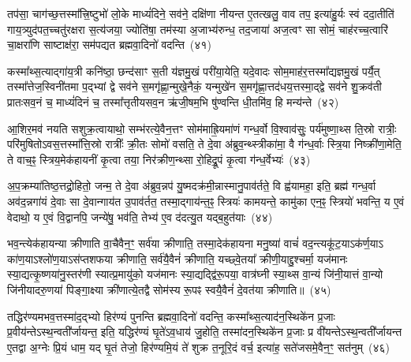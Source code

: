 तप॑सा॒ चाग॑च्छ॒त्तस्मा᳚त्त्रि॒ष्टुभो॑ लो॒के माध्यं॑दिने॒ सव॑ने॒ दक्षि॑णा नीयन्त ए॒तत्खलु॒ वाव तप॒ इत्या॑हु॒र्यः स्वं ददा॒तीति॑ गाय॒त्र्युद॑पत॒च्चतु॑रक्षरा स॒त्य॑जया॒ ज्योति॑षा॒ तम॑स्या अ॒जाभ्य॑रुन्ध॒ तद॒जाया॑ अज॒त्वꣳ सा सोमं॒ चाह॑रच्च॒त्वारि॑ चा॒क्षरा॑णि साष्टाक्ष॑रा॒ सम॑पद्यत ब्रह्मवा॒दिनो॑ वदन्ति~(४१)

कस्मा᳚थ्स॒त्याद्गा॑य॒त्री कनि॑ष्ठा॒ छन्द॑साꣳ स॒ती य॑ज्ञमु॒खं परी॑या॒येति॒ यदे॒वादः सोम॒माह॑र॒त्तस्मा᳚द्यज्ञमु॒खं पर्यै॒त् तस्मा᳚त्तेज॒स्विनी॑तमा प॒द्भ्यां द्वे सव॑ने स॒मगृ॑ह्णा॒न्मुखे॒नैकं॒ यन्मुखे॑न स॒मगृ॑ह्णा॒त्तद॑धय॒त्तस्मा॒द्द्वे सव॑ने शु॒क्रव॑ती प्रातःसव॒नं च॒ माध्यं॑दिनं च॒ तस्मा᳚त्तृतीयसव॒न ऋ॑जी॒षम॒भि षु॑ण्वन्ति धी॒तमि॑व॒ हि मन्य॑न्ते~(४२)

आ॒शिर॒मव॑ नयति सशुक्र॒त्वायाथो॒ सम्भ॑रत्ये॒वैन॒त्तꣳ सोम॑माह्रि॒यमा॑णं गन्ध॒र्वो वि॒श्वाव॑सुः॒ पर्य॑मुष्णा॒थ्स ति॒स्रो रात्रीः॒ परि॑मुषितो\-ऽवस॒त्तस्मा᳚त्ति॒स्रो रात्रीः᳚ क्री॒तः सोमो॑ वसति॒ ते दे॒वा अ॑ब्रुव॒न्थ्स्त्रीका॑मा॒ वै ग॑न्ध॒र्वाः स्त्रि॒या निष्क्री॑णा॒मेति॒ ते वाच॒ꣴ॒ स्त्रिय॒मेक॑हायनीं कृ॒त्वा तया॒ निर॑क्रीण॒न्थ्सा रो॒हिद्रू॒पं कृ॒त्वा ग॑न्ध॒र्वेभ्यः॑~(४३)

अ॒प॒क्रम्या॑तिष्ठ॒त्तद्रो॒हितो॒ जन्म॒ ते दे॒वा अ॑ब्रुव॒न्नप॑ यु॒ष्मदक्र॑मी॒न्नास्मानु॒पाव॑र्तते॒ वि ह्व॑यामहा॒ इति॒ ब्रह्म॑ गन्ध॒र्वा अव॑द॒न्नगा॑यं दे॒वाः सा दे॒वान्गाय॑त उ॒पाव॑र्तत॒ तस्मा॒द्गाय॑न्त॒ꣴ॒ स्त्रियः॑ कामयन्ते॒ कामु॑का एन॒ꣴ॒ स्त्रियो॑ भवन्ति॒ य ए॒वं वेदाथो॒ य ए॒वं वि॒द्वानपि॒ जन्ये॑षु॒ भव॑ति॒ तेभ्य॑ ए॒व द॑दत्यु॒त यद्ब॒हुत॑याः~(४४)

भव॒न्त्येक॑हायन्या क्रीणाति वा॒चैवैन॒ꣳ॒ सर्व॑या क्रीणाति॒ तस्मा॒देक॑हायना मनु॒ष्या॑ वाचं॑ वद॒न्त्यकू॑ट॒या\-ऽक॑र्ण॒या\-ऽ का॑ण॒या\-ऽश्लो॑ण॒या\-ऽस॑प्तशफया क्रीणाति॒ सर्व॑यै॒वैनं॑ क्रीणाति॒ यच्छ्वे॒तया᳚ क्रीणी॒याद्दु॒श्चर्मा॒ यज॑मानः स्या॒द्यत्कृ॒ष्णया॑नु॒स्तर॑णी स्यात्प्र॒मायु॑को॒ यज॑मानः स्या॒द्यद्द्वि॑रू॒पया॒ वात्र॑घ्नी स्या॒थ्स वा॒न्यं जि॑नी॒यात्तं वा॒न्यो जि॑नीयादरु॒णया॑ पिङ्गा॒क्ष्या क्री॑णात्ये॒तद्वै सोम॑स्य रू॒पꣴ स्वयै॒वैनं॑ दे॒वत॑या क्रीणाति॥~(४५)

{\anuvakamend[{निष्क्री॑णीष्व॒ दक्षि॑णाभिश्च वदन्ति॒ मन्य॑न्ते गन्ध॒र्वेभ्यो॑ ब॒हुत॑याः पिङ्गा॒क्ष्या दश॑ च}]}%

तद्धिर॑ण्यमभव॒त्तस्मा॑द॒द्भ्यो हिर॑ण्यं पुनन्ति ब्रह्मवा॒दिनो॑ वदन्ति॒ कस्मा᳚थ्स॒त्याद॑न॒स्थिके॑न प्र॒जाः प्र॒वीय॑न्ते\-ऽ\-स्थ॒न्वती᳚र्जायन्त॒ इति॒ यद्धिर॑ण्यं घृ॒ते॑\-ऽव॒धाय॑ जु॒होति॒ तस्मा॑दन॒स्थिके॑न प्र॒जाः प्र वी॑यन्ते\-ऽस्थ॒न्वती᳚र्जायन्त ए॒तद्वा अ॒ग्नेः प्रि॒यं धाम॒ यद् घृ॒तं तेजो॒ हिर॑ण्यमि॒यं ते॑ शुक्र त॒नूरि॒दं वर्च॒ इत्या॑ह॒ सते॑जसमे॒वैन॒ꣳ॒ सत॑नुम्~(४६)

